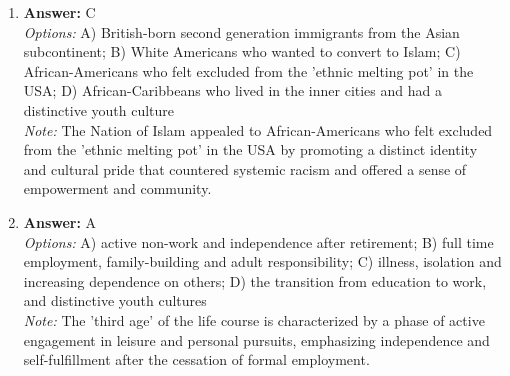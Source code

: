 \documentclass[12pt]{article}
\begin{document}
\begin{enumerate}[label=\arabic*.]
\item \textbf{Answer:} C
\\ \textit{Options:} A) British-born second generation immigrants from the Asian subcontinent; B) White Americans who wanted to convert to Islam; C) African-Americans who felt excluded from the 'ethnic melting pot' in the USA; D) African-Caribbeans who lived in the inner cities and had a distinctive youth culture
\\ \textit{Note:} The Nation of Islam appealed to African-Americans who felt excluded from the 'ethnic melting pot' in the USA by promoting a distinct identity and cultural pride that countered systemic racism and offered a sense of empowerment and community.
\item \textbf{Answer:} A
\\ \textit{Options:} A) active non-work and independence after retirement; B) full time employment, family-building and adult responsibility; C) illness, isolation and increasing dependence on others; D) the transition from education to work, and distinctive youth cultures
\\ \textit{Note:} The 'third age' of the life course is characterized by a phase of active engagement in leisure and personal pursuits, emphasizing independence and self-fulfillment after the cessation of formal employment.
\end{enumerate}
\end{document}
